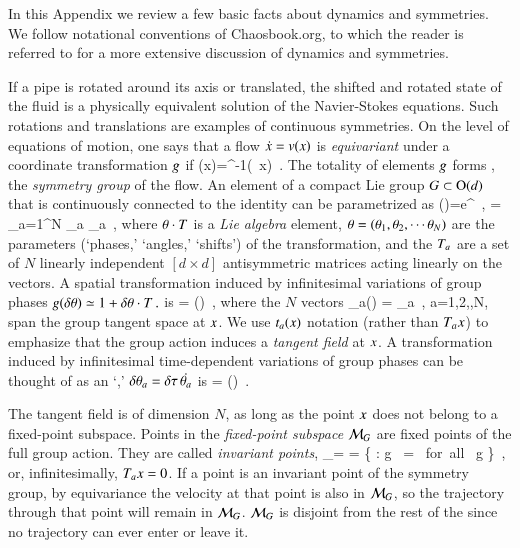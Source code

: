 

In this Appendix we review a few basic facts about dynamics and
symmetries. We follow notational conventions of
Chaosbook.org, to which the reader is referred to for a more
extensive discussion of dynamics and symmetries.

If a pipe is rotated around its axis or translated, the shifted and
rotated state of the fluid is a physically equivalent solution of
the Navier-Stokes equations. Such rotations and translations
are examples of continuous symmetries. On the level of equations of
motion, one says that a flow $\dot{x}= v(x)$ is \emph{equivariant}
under a coordinate transformation $g$ if
\beq
\vel(x)=\LieEl^{-1}\vel(\LieEl \, x)
\,.
The totality of elements
$g$ forms \Group, the {\em symmetry group} of the flow.
An element of a compact Lie group $G \subset \textrm{O}(d)$ that is
continuously connected to the identity can be parametrized as
\beq
\LieEl(\gSpace)=e^{{\gSpace} \cdot \Lg }
    \,,\qquad
\gSpace \cdot \Lg = \sum_{a=1}^N \gSpace_a \Lg_a
\,,
where ${\bf \theta} \cdot T $ is a \emph{Lie algebra} element, ${\bf \theta} =
({\bf \theta}_1,{\bf \theta}_2,\cdots{\bf \theta}_N)$ are the parameters (`phases,'
`angles,' `shifts') of the transformation, and the $T_a$ are a set of
$N$ linearly independent $[d\!\times\!d]$ antisymmetric matrices acting
linearly on the {\statesp} vectors. A spatial transformation induced by
infinitesimal variations of group phases
$
g(\delta {\bf \theta}) \simeq 1 + \delta {\bf \theta} \cdot T
\,.
$ %
is
\beq
\delta {\ssp} = \delta \gSpace \cdot \groupTan(\ssp)
\,,
where the $N$ vectors
\beq
 \groupTan_{a}(\ssp) = \Lg _{a} \ssp
    \,,\qquad
 a=1,2,\cdots,N,
span the group tangent space at $x$. We use $t_a(x)$
notation (rather than $T_{a}x$) to emphasize that the group action
induces a \emph{tangent field} at $x$.
A transformation induced by infinitesimal
time-dependent variations  of group phases
can be thought of as an `{\angVel},'
$\delta {\bf \theta}_a = {\delta \tau} \, \dot{{\bf \theta}_a}$ is
\beq
\dot{\ssp} = \dot{\gSpace} \cdot \groupTan(\ssp)
\,.

The {tangent field} is of dimension $N$, as long as the point $x$ does
not belong to a fixed-point subspace. Points in the \emph{fixed-point
subspace}  ${\cal M}_{G}$ are fixed points of the full group action. They
are called \emph{invariant points},
\beq
\pS_\Group = \Fix{\Group} =
   \{ \ssp \in \pS : {g} \, \ssp = \ssp \mbox{ for all } g \in \Group \}
\,,
or, infinitesimally,  $T_{a}x=0$. If a point is an invariant point
of the symmetry group, by equivariance the velocity at that point is also
in ${\cal M}_{G}$, so the trajectory through that point will remain in
${\cal M}_{G}$. ${\cal M}_{G}$ is disjoint from the rest of the {\statesp}
since no trajectory can ever enter or leave it.

